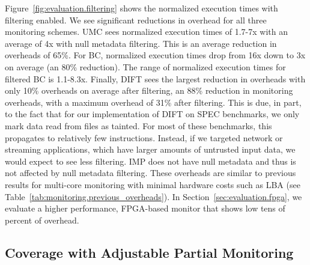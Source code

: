 Figure~\ref{fig:evaluation.filtering} shows the
normalized execution times with filtering enabled. We see significant
reductions in overhead for all three monitoring schemes. UMC sees normalized
execution times of 1.7-7x with an average of 4x with null metadata filtering.
This is an average reduction in overheads of 65\%. For BC, normalized execution
times drop from 16x down to 3x on average (an 80\% reduction). The range of normalized execution
times for filtered BC is 1.1-8.3x. 
Finally, DIFT sees the largest reduction in overheads with only 10\% overheads
on average after filtering, an 88\% reduction in monitoring overheads, with a
maximum overhead of 31\% after filtering. This is due, in part, to the fact
that for our implementation of DIFT on SPEC
benchmarks, we only mark data read from files as tainted. For most of these
benchmarks, this propagates to relatively few instructions. Instead, if we
targeted network or streaming applications, which have larger amounts of
untrusted input data, we would expect to see less filtering. IMP does not have
null metadata and thus is not affected by null metadata filtering.
These overheads are similar to previous results for multi-core monitoring with
minimal hardware costs such as LBA \cite{lba-asid06} (see
Table~\ref{tab:monitoring.previous_overheads}). In
Section~\ref{sec:evaluation.fpga}, we evaluate a higher performance, FPGA-based
monitor that shows low tens of percent of overhead.

\subsection{Coverage with Adjustable Partial Monitoring}

